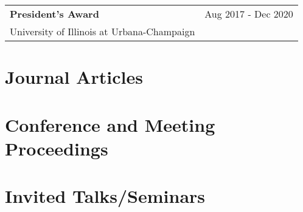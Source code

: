 \documentclass[letterpaper,12pt]{article}
\begin{document}
\begin{tabularx}{\linewidth}{@{}l X@{}}
\textbf{President's Award} & \hfill Aug 2017 - Dec 2020 \\[3.75pt]
University of Illinois at Urbana-Champaign & \hfill \\[3.75pt]
\end{tabularx}

\newpage
\section{Journal Articles}
\begin{refsection}
\nocite{*}
\printbibliography[heading=none]
\end{refsection}

\section{Conference and Meeting Proceedings}
\begin{refsection}
\nocite{*}
\printbibliography[heading=none]
\end{refsection}

\section{Invited Talks/Seminars}
\begin{refsection}
\nocite{*}
\printbibliography[heading=none]
\end{refsection}

\end{document}
